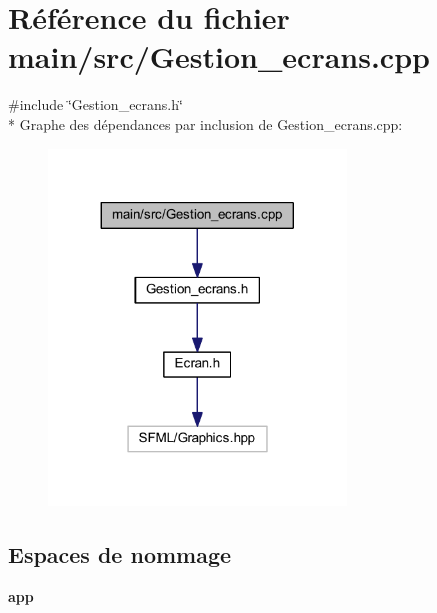 \section{Référence du fichier main/src/\+Gestion\+\_\+ecrans.cpp}
\label{_gestion__ecrans_8cpp}
{\ttfamily \#include \char`\"{}Gestion\+\_\+ecrans.\+h\char`\"{}}\\*
Graphe des dépendances par inclusion de Gestion\+\_\+ecrans.\+cpp\+:\nopagebreak
\begin{figure}[H]
\begin{center}
\leavevmode
\includegraphics[width=224pt]{_gestion__ecrans_8cpp__incl}
\end{center}
\end{figure}
\subsection*{Espaces de nommage}
\begin{DoxyCompactItemize}
\item 
 {\bf app}
\end{DoxyCompactItemize}
